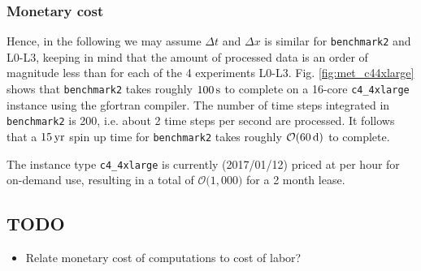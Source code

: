 \documentclass[12pt,a4paper]{article}
\begin{document}
\subsubsection{Monetary cost}

Hence, in the following we may assume $\Delta t$ and $\Delta x$ is similar for \verb|benchmark2| and L0-L3, keeping in mind that the amount of processed data is an order of magnitude less than for each of the 4 experiments L0-L3.
Fig. \ref{fig:met_c44xlarge} shows that \verb|benchmark2| takes roughly $100\,\rm s$ to complete on a 16-core \verb|c4_4xlarge| instance using the gfortran compiler. The number of time steps integrated in  \verb|benchmark2| is 200, i.e. about 2 time steps per second are processed. It follows that a $15\,\rm yr$ spin up time for \verb|benchmark2| takes roughly $\mathcal{O}(60\,\rm d)$ to complete.

The instance type \verb|c4_4xlarge| is currently (2017/01/12) priced at  per hour for on-demand use, resulting in a total of $\mathcal{O}($\textdollar $1,000) $ for a 2 month lease.


\subsection{TODO}

\begin{itemize}
	\item Relate monetary cost of computations to cost of labor?
\end{itemize}

	


\end{document}

